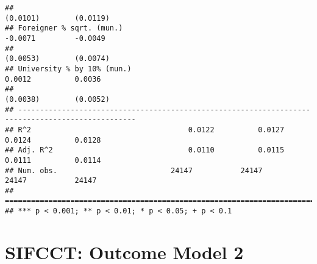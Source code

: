 \documentclass[
]{article}
\begin{document}
\begin{verbatim}
##                                                                       (0.0101)        (0.0119)   
## Foreigner % sqrt. (mun.)                                              -0.0071         -0.0049    
##                                                                       (0.0053)        (0.0074)   
## University % by 10% (mun.)                                             0.0012          0.0036    
##                                                                       (0.0038)        (0.0052)   
## -------------------------------------------------------------------------------------------------
## R^2                                    0.0122          0.0127          0.0124          0.0128    
## Adj. R^2                               0.0110          0.0115          0.0111          0.0114    
## Num. obs.                          24147           24147           24147           24147         
## =================================================================================================
## *** p < 0.001; ** p < 0.01; * p < 0.05; + p < 0.1
\end{verbatim}

\hypertarget{sifcct-outcome-model-2}{%
\section{SIFCCT: Outcome Model 2}\label{sifcct-outcome-model-2}}
\end{document}
